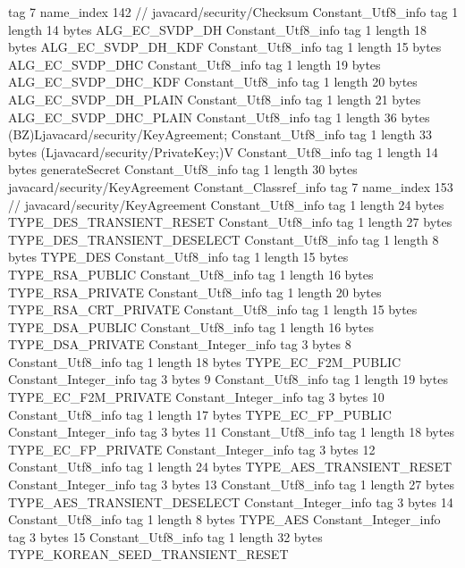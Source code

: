 {{{			tag	7
			name_index	142		// javacard/security/Checksum
		}
		Constant_Utf8_info {
			tag	1
			length	14
			bytes	ALG_EC_SVDP_DH
		}
		Constant_Utf8_info {
			tag	1
			length	18
			bytes	ALG_EC_SVDP_DH_KDF
		}
		Constant_Utf8_info {
			tag	1
			length	15
			bytes	ALG_EC_SVDP_DHC
		}
		Constant_Utf8_info {
			tag	1
			length	19
			bytes	ALG_EC_SVDP_DHC_KDF
		}
		Constant_Utf8_info {
			tag	1
			length	20
			bytes	ALG_EC_SVDP_DH_PLAIN
		}
		Constant_Utf8_info {
			tag	1
			length	21
			bytes	ALG_EC_SVDP_DHC_PLAIN
		}
		Constant_Utf8_info {
			tag	1
			length	36
			bytes	(BZ)Ljavacard/security/KeyAgreement;
		}
		Constant_Utf8_info {
			tag	1
			length	33
			bytes	(Ljavacard/security/PrivateKey;)V
		}
		Constant_Utf8_info {
			tag	1
			length	14
			bytes	generateSecret
		}
		Constant_Utf8_info {
			tag	1
			length	30
			bytes	javacard/security/KeyAgreement
		}
		Constant_Classref_info {
			tag	7
			name_index	153		// javacard/security/KeyAgreement
		}
		Constant_Utf8_info {
			tag	1
			length	24
			bytes	TYPE_DES_TRANSIENT_RESET
		}
		Constant_Utf8_info {
			tag	1
			length	27
			bytes	TYPE_DES_TRANSIENT_DESELECT
		}
		Constant_Utf8_info {
			tag	1
			length	8
			bytes	TYPE_DES
		}
		Constant_Utf8_info {
			tag	1
			length	15
			bytes	TYPE_RSA_PUBLIC
		}
		Constant_Utf8_info {
			tag	1
			length	16
			bytes	TYPE_RSA_PRIVATE
		}
		Constant_Utf8_info {
			tag	1
			length	20
			bytes	TYPE_RSA_CRT_PRIVATE
		}
		Constant_Utf8_info {
			tag	1
			length	15
			bytes	TYPE_DSA_PUBLIC
		}
		Constant_Utf8_info {
			tag	1
			length	16
			bytes	TYPE_DSA_PRIVATE
		}
		Constant_Integer_info {
			tag	3
			bytes	8
		}
		Constant_Utf8_info {
			tag	1
			length	18
			bytes	TYPE_EC_F2M_PUBLIC
		}
		Constant_Integer_info {
			tag	3
			bytes	9
		}
		Constant_Utf8_info {
			tag	1
			length	19
			bytes	TYPE_EC_F2M_PRIVATE
		}
		Constant_Integer_info {
			tag	3
			bytes	10
		}
		Constant_Utf8_info {
			tag	1
			length	17
			bytes	TYPE_EC_FP_PUBLIC
		}
		Constant_Integer_info {
			tag	3
			bytes	11
		}
		Constant_Utf8_info {
			tag	1
			length	18
			bytes	TYPE_EC_FP_PRIVATE
		}
		Constant_Integer_info {
			tag	3
			bytes	12
		}
		Constant_Utf8_info {
			tag	1
			length	24
			bytes	TYPE_AES_TRANSIENT_RESET
		}
		Constant_Integer_info {
			tag	3
			bytes	13
		}
		Constant_Utf8_info {
			tag	1
			length	27
			bytes	TYPE_AES_TRANSIENT_DESELECT
		}
		Constant_Integer_info {
			tag	3
			bytes	14
		}
		Constant_Utf8_info {
			tag	1
			length	8
			bytes	TYPE_AES
		}
		Constant_Integer_info {
			tag	3
			bytes	15
		}
		Constant_Utf8_info {
			tag	1
			length	32
			bytes	TYPE_KOREAN_SEED_TRANSIENT_RESET
}}}
